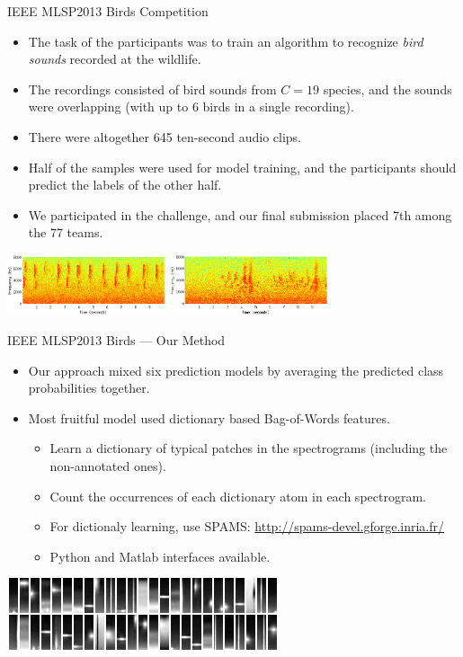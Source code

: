 \documentclass[10pt, aspectratio=169]{beamer} %
\begin{document}
\begin{frame}
{IEEE MLSP2013 Birds Competition}
\begin{itemize}
\item The task of the participants was to
train an algorithm to recognize \emph{bird sounds} recorded at the wildlife.
\item The recordings consisted of bird sounds from $C = 19$ species, and the sounds
were overlapping (with up to 6 birds in a single recording).
\item There were altogether
645 ten-second audio clips.
\item Half of the samples
 were used for model training, and the participants should predict the
 labels of the other half.
\item We participated in the challenge, and our final
submission placed 7th among the 77 teams.
\end{itemize}
\centerline{\includegraphics[width=0.35\textwidth]{bird1.png}
\quad
\includegraphics[width=0.35\textwidth]{bird2.png}}
\end{frame}

\begin{frame}
{IEEE MLSP2013 Birds --- Our Method}
\begin{itemize}
\item Our approach mixed six prediction models
by averaging the predicted class probabilities together. 
\item Most fruitful model used dictionary based Bag-of-Words features.
\begin{itemize}
\item Learn a dictionary of typical patches in the spectrograms (including the non-annotated ones).
\item Count the occurrences of each dictionary atom in each spectrogram.
\item For dictionaly learning, use SPAMS: \url{http://spams-devel.gforge.inria.fr/}
\item Python and Matlab interfaces available.
\end{itemize}
\end{itemize}
\vspace*{-0.3cm}
\begin{center}
\includegraphics[width=0.6\columnwidth]{dict1.png}
\end{center}
\end{frame}
\end{document}
